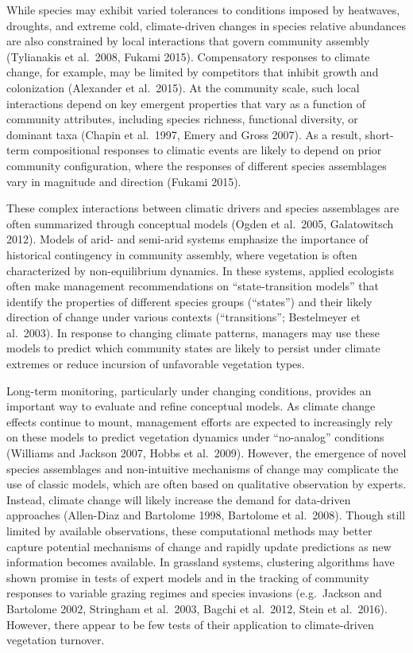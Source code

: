 \documentclass[twoside,12pt,final]{ucthesis-CA2012}
\begin{document}
\begin{ucmainmatter}
While species may exhibit varied tolerances to conditions imposed by heatwaves, droughts, and extreme cold, climate-driven changes in species relative abundances are also constrained by local interactions that govern community assembly (Tylianakis et al.~2008, Fukami 2015).
Compensatory responses to climate change, for example, may be limited by competitors that inhibit growth and colonization (Alexander et al.~2015).
At the community scale, such local interactions depend on key emergent properties that vary as a function of community attributes, including species richness, functional diversity, or dominant taxa (Chapin et al.~1997, Emery and Gross 2007).
As a result, short-term compositional responses to climatic events are likely to depend on prior community configuration, where the responses of different species assemblages vary in magnitude and direction (Fukami 2015).

These complex interactions between climatic drivers and species assemblages are often summarized through conceptual models (Ogden et al.~2005, Galatowitsch 2012).
Models of arid- and semi-arid systems emphasize the importance of historical contingency in community assembly, where vegetation is often characterized by non-equilibrium dynamics.
In these systems, applied ecologists often make management recommendations on ``state-transition models'' that identify the properties of different species groups (``states'') and their likely direction of change under various contexts (``transitions''; Bestelmeyer et al.~2003).
In response to changing climate patterns, managers may use these models to predict which community states are likely to persist under climate extremes or reduce incursion of unfavorable vegetation types.

Long-term monitoring, particularly under changing conditions, provides an important way to evaluate and refine conceptual models.
As climate change effects continue to mount, management efforts are expected to increasingly rely on these models to predict vegetation dynamics under ``no-analog'' conditions (Williams and Jackson 2007, Hobbs et al.~2009).
However, the emergence of novel species assemblages and non-intuitive mechanisms of change may complicate the use of classic models, which are often based on qualitative observation by experts.
Instead, climate change will likely increase the demand for data-driven approaches (Allen-Diaz and Bartolome 1998, Bartolome et al.~2008).
Though still limited by available observations, these computational methods may better capture potential mechanisms of change and rapidly update predictions as new information becomes available.
In grassland systems, clustering algorithms have shown promise in tests of expert models and in the tracking of community responses to variable grazing regimes and species invasions (e.g.~Jackson and Bartolome 2002, Stringham et al.~2003, Bagchi et al.~2012, Stein et al.~2016).
However, there appear to be few tests of their application to climate-driven vegetation turnover.


\end{ucmainmatter}
\end{document}
